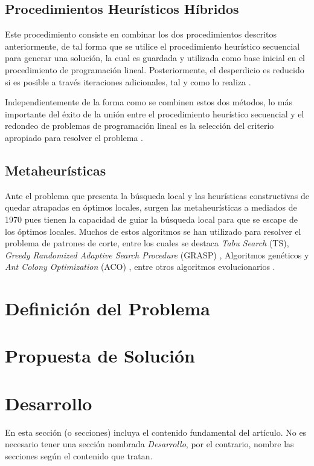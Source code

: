 \documentclass[a4paper,10pt,twocolumn]{article}
\begin{document}
\subsection{Procedimientos Heurísticos Híbridos }
Este procedimiento consiste en combinar los dos
procedimientos descritos anteriormente, de tal forma
que se utilice el procedimiento heurístico secuencial
para generar una solución, la cual es guardada y
utilizada como base inicial en el procedimiento de
programación lineal. Posteriormente, el desperdicio es
reducido si es posible a través iteraciones adicionales,
tal y como lo realiza \cite{41}. 

Independientemente de la forma como
se combinen estos dos métodos, lo más importante
del éxito de la unión entre el procedimiento heurístico
secuencial y el redondeo de problemas de programación
lineal es la selección del criterio apropiado para resolver
el problema \cite{29}.

\subsection{ Metaheurísticas }
Ante el problema que presenta la búsqueda local y
las heurísticas constructivas de quedar atrapadas en
óptimos locales, surgen las metaheurísticas a mediados
de 1970 pues tienen la capacidad de guiar la búsqueda
local para que se escape de los óptimos locales. Muchos
de estos algoritmos se han utilizado para resolver
el problema de patrones de corte, entre los cuales
se destaca \textit{Tabu Search} (TS), \textit{Greedy Randomized
Adaptive Search Procedure} (GRASP) \cite{42}, Algoritmos
genéticos \cite{43,46} y \textit{Ant Colony Optimization} (ACO) \cite{47,48}, entre otros algoritmos evolucionarios \cite{51}.

\section{Definición del Problema}

\section{Propuesta de Solución}

\section{Desarrollo}\label{sec:dev}
  En esta sección (o secciones) incluya el contenido fundamental del artículo.
  No es necesario tener una sección nombrada \emph{Desarrollo}, por el contrario,
  nombre las secciones según el contenido que tratan.
\end{document}
